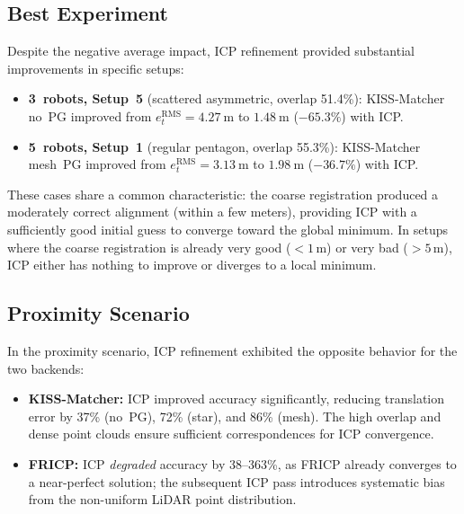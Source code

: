 \subsection{Best Experiment}

Despite the negative average impact, ICP refinement provided
substantial improvements in specific setups:
\begin{itemize}
    \item \textbf{3~robots, Setup~5} (scattered asymmetric,
          overlap 51.4\%): KISS-Matcher no~PG improved from
          $e_t^\mathrm{RMS} = \SI{4.27}{\metre}$ to
          $\SI{1.48}{\metre}$ ($-65.3\%$) with ICP.
    \item \textbf{5~robots, Setup~1} (regular pentagon,
          overlap 55.3\%): KISS-Matcher mesh~PG improved from
          $e_t^\mathrm{RMS} = \SI{3.13}{\metre}$ to
          $\SI{1.98}{\metre}$ ($-36.7\%$) with ICP.
\end{itemize}

These cases share a common characteristic: the coarse registration
produced a moderately correct alignment (within a few meters),
providing ICP with a sufficiently good initial guess to converge
toward the global minimum.
In setups where the coarse registration is already very good
($< 1$\,m) or very bad ($> 5$\,m), ICP either has nothing to
improve or diverges to a local minimum.

\subsection{Proximity Scenario}

In the proximity scenario, ICP refinement exhibited the opposite
behavior for the two backends:
\begin{itemize}
    \item \textbf{KISS-Matcher:} ICP improved accuracy significantly,
          reducing translation error by 37\% (no~PG), 72\% (star),
          and 86\% (mesh).
          The high overlap and dense point clouds ensure sufficient
          correspondences for ICP convergence.
    \item \textbf{FRICP:} ICP \emph{degraded} accuracy by
          38--363\%, as FRICP already converges to a near-perfect
          solution; the subsequent ICP pass introduces systematic
          bias from the non-uniform LiDAR point distribution.
\end{itemize}

